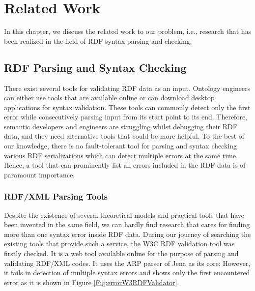 \chapter{Related Work}
\label{ch:related}


In this chapter, we discuss the related work to our problem, i.e., research that has been realized in the field of RDF syntax parsing and checking.

\section{RDF Parsing and Syntax Checking}

There exist several tools for validating RDF data as an input.
Ontology engineers can either use tools that are available online or can download desktop applications for syntax validation.
These tools  can commonly detect only the first error while consecutively parsing input from its start point to its end. 
Therefore, semantic developers and engineers are struggling whilst debugging their RDF data, and they need alternative tools that could be more helpful. 
To the best of our knowledge, there is no fault-tolerant tool for parsing and syntax checking various RDF serializations which can detect multiple errors at the same time.  
Hence, a tool that can prominently list all errors included in the RDF data is of paramount importance.

\subsection{RDF/XML Parsing Tools}

Despite the existence of several theoretical models and practical tools that have been invented in the same field, we can hardly find  research that cares for finding more than one syntax error inside RDF data. 
During our journey of searching the existing tools that provide such a service, the W3C RDF validation tool \cite{W3C:Validation:Online} was firstly checked.
It is a web tool available online for the purpose of parsing and validating RDF/XML codes. 
It uses the ARP parser of Jena \cite{McBride:2002:JSW:613357.613755} as its core; However, it fails in detection of multiple syntax errors and shows only the first encountered error as it is shown in Figure \ref{Fig:errorW3RDFValidator}.
 
